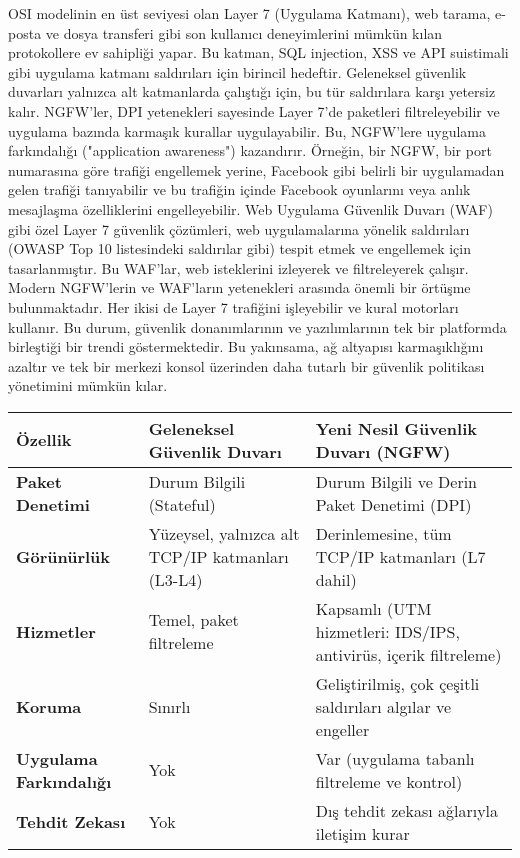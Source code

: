 OSI modelinin en üst seviyesi olan Layer 7 (Uygulama Katmanı), web tarama, e-posta ve dosya transferi gibi son kullanıcı deneyimlerini mümkün kılan protokollere ev sahipliği yapar. Bu katman, SQL injection, XSS ve API suistimali gibi uygulama katmanı saldırıları için birincil hedeftir. Geleneksel güvenlik duvarları yalnızca alt katmanlarda çalıştığı için, bu tür saldırılara karşı yetersiz kalır.
NGFW'ler, DPI yetenekleri sayesinde Layer 7'de paketleri filtreleyebilir ve uygulama bazında karmaşık kurallar uygulayabilir. Bu, NGFW'lere uygulama farkındalığı ("application awareness") kazandırır. Örneğin, bir NGFW, bir port numarasına göre trafiği engellemek yerine, Facebook gibi belirli bir uygulamadan gelen trafiği tanıyabilir ve bu trafiğin içinde Facebook oyunlarını veya anlık mesajlaşma özelliklerini engelleyebilir.
Web Uygulama Güvenlik Duvarı (WAF) gibi özel Layer 7 güvenlik çözümleri, web uygulamalarına yönelik saldırıları (OWASP Top 10 listesindeki saldırılar gibi) tespit etmek ve engellemek için tasarlanmıştır. Bu WAF'lar, web isteklerini izleyerek ve filtreleyerek çalışır. Modern NGFW'lerin ve WAF'ların yetenekleri arasında önemli bir örtüşme bulunmaktadır. Her ikisi de Layer 7 trafiğini işleyebilir ve kural motorları kullanır. Bu durum, güvenlik donanımlarının ve yazılımlarının tek bir platformda birleştiği bir trendi göstermektedir. Bu yakınsama, ağ altyapısı karmaşıklığını azaltır ve tek bir merkezi konsol üzerinden daha tutarlı bir güvenlik politikası yönetimini mümkün kılar.

\begin{adjustbox}{max width=\textwidth}
\begin{tabularx}{\textwidth}{|l|X|X|}
\hline
\textbf{Özellik} & \textbf{Geleneksel Güvenlik Duvarı} & \textbf{Yeni Nesil Güvenlik Duvarı (NGFW)} \\
\hline
\textbf{Paket Denetimi} & Durum Bilgili (Stateful) & Durum Bilgili ve Derin Paket Denetimi (DPI) \\
\hline
\textbf{Görünürlük} & Yüzeysel, yalnızca alt TCP/IP katmanları (L3-L4) & Derinlemesine, tüm TCP/IP katmanları (L7 dahil) \\
\hline
\textbf{Hizmetler} & Temel, paket filtreleme & Kapsamlı (UTM hizmetleri: IDS/IPS, antivirüs, içerik filtreleme) \\
\hline
\textbf{Koruma} & Sınırlı & Geliştirilmiş, çok çeşitli saldırıları algılar ve engeller \\
\hline
\textbf{Uygulama Farkındalığı} & Yok & Var (uygulama tabanlı filtreleme ve kontrol) \\
\hline
\textbf{Tehdit Zekası} & Yok & Dış tehdit zekası ağlarıyla iletişim kurar \\
\hline
\end{tabularx}
\end{adjustbox}


